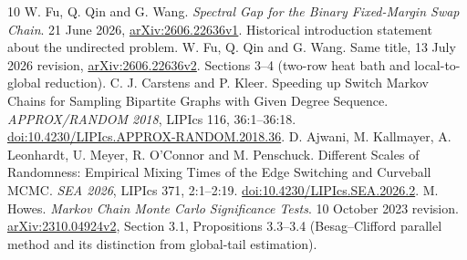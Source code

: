 \documentclass[11pt]{article}
\begin{document}
\begin{thebibliography}{10}
 W. Fu, Q. Qin and G. Wang. \emph{Spectral Gap for the Binary Fixed-Margin Swap Chain}. 21 June 2026, \href{https://arxiv.org/abs/2606.22636v1}{arXiv:2606.22636v1}. Historical introduction statement about the undirected problem.
 W. Fu, Q. Qin and G. Wang. Same title, 13 July 2026 revision, \href{https://arxiv.org/abs/2606.22636v2}{arXiv:2606.22636v2}. Sections 3--4 (two-row heat bath and local-to-global reduction).
 C. J. Carstens and P. Kleer. Speeding up Switch Markov Chains for Sampling Bipartite Graphs with Given Degree Sequence. \emph{APPROX/RANDOM 2018}, LIPIcs 116, 36:1--36:18. \href{https://doi.org/10.4230/LIPIcs.APPROX-RANDOM.2018.36}{doi:10.4230/LIPIcs.APPROX-RANDOM.2018.36}.
 D. Ajwani, M. Kallmayer, A. Leonhardt, U. Meyer, R. O'Connor and M. Penschuck. Different Scales of Randomness: Empirical Mixing Times of the Edge Switching and Curveball MCMC. \emph{SEA 2026}, LIPIcs 371, 2:1--2:19. \href{https://doi.org/10.4230/LIPIcs.SEA.2026.2}{doi:10.4230/LIPIcs.SEA.2026.2}.
 M. Howes. \emph{Markov Chain Monte Carlo Significance Tests}. 10 October 2023 revision. \href{https://arxiv.org/abs/2310.04924v2}{arXiv:2310.04924v2}, Section 3.1, Propositions 3.3--3.4 (Besag--Clifford parallel method and its distinction from global-tail estimation).
\end{thebibliography}
\endgroup
\end{document}
